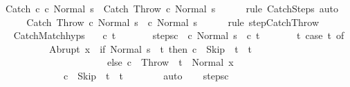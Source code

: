 \begin{isabellebody}
\ {\isachardoublequoteopen}{\isasymGamma}{\isasymturnstile}\ {\isacharparenleft}Catch\ c\ c\ Normal\ s{\isacharparenright}\ {\isasymrightarrow}\isactrlsup {\isacharasterisk}\ {\isacharparenleft}Catch\ Throw\ c\ Normal\ s{\isacharprime}{\isacharparenright}{\isachardoublequoteclose}\isanewline
\ \ \ \ \isamarkupfalse%
\ {\isacharparenleft}rule\ CatchSteps{\isacharparenright}\ auto\isanewline
\ \ \isamarkupfalse%
\ \isamarkupfalse%
\ {\isachardoublequoteopen}{\isasymGamma}{\isasymturnstile}\ {\isacharparenleft}Catch\ Throw\ c\ Normal\ s{\isacharprime}{\isacharparenright}\ {\isasymrightarrow}\ {\isacharparenleft}c\ Normal\ s{\isacharprime}{\isacharparenright}{\isachardoublequoteclose}\isanewline
\ \ \ \ \isamarkupfalse%
\ {\isacharparenleft}rule\ step{\isachardot}CatchThrow{\isacharparenright}\isanewline
\ \ \isamarkupfalse%
\isanewline
\ \ \isamarkupfalse%
\ CatchMatch{\isachardot}hyps\ {\isacharparenleft}{}{\isacharparenright}\ \isamarkupfalse%
\ c{\isacharprime}\ t{\isacharprime}\ \isanewline
\ \ \ \ \ \ steps{\isacharunderscore}c\ {\isachardoublequoteopen}{\isasymGamma}{\isasymturnstile}\ {\isacharparenleft}c\ Normal\ s{\isacharprime}{\isacharparenright}\ {\isasymrightarrow}\isactrlsup {\isacharasterisk}\ {\isacharparenleft}c{\isacharprime}{\isacharcomma}\ t{\isacharprime}{\isacharparenright}{\isachardoublequoteclose}\ \isanewline
\ \ \ \ \ \ t{\isacharcolon}\ {\isachardoublequoteopen}{\isacharparenleft}case\ t\ of\isanewline
\ \ \ \ \ \ \ \ \ \ \ Abrupt\ x\ {\isasymRightarrow}\ if\ Normal\ s{\isacharprime}\ {\isacharequal}\ t\ then\ c{\isacharprime}\ {\isacharequal}\ Skip\ {\isasymand}\ t{\isacharprime}\ {\isacharequal}\ t\ \isanewline
\ \ \ \ \ \ \ \ \ \ \ \ \ \ \ \ \ \ \ \ \ \ \ else\ c{\isacharprime}\ {\isacharequal}\ Throw\ {\isasymand}\ t{\isacharprime}\ {\isacharequal}\ Normal\ x\isanewline
\ \ \ \ \ \ \ \ \ \ \ {\isacharbar}\ {\isacharunderscore}\ {\isasymRightarrow}\ c{\isacharprime}\ {\isacharequal}\ Skip\ {\isasymand}\ t{\isacharprime}\ {\isacharequal}\ t{\isacharparenright}{\isachardoublequoteclose}\isanewline
\ \ \ \ \ \ \isamarkupfalse%
\ auto\isanewline
\ \ \isamarkupfalse%
\ steps{\isacharunderscore}c\ \ \isanewline

\end{isabellebody}
